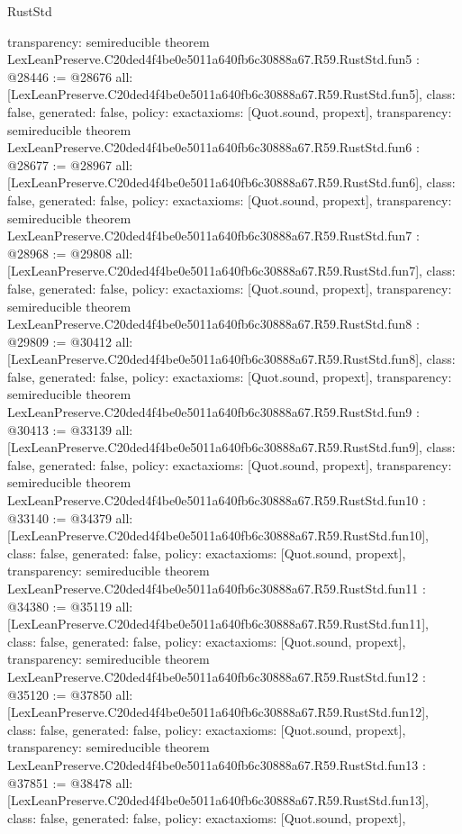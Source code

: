 \begin{lexlean}{RustStd}
\begin{coremodule}
{  transparency: semireducible
}
theorem LexLeanPreserve.C20ded4f4be0e5011a640fb6c30888a67.R59.RustStd.fun5 : @28446 := @28676 {
  all: [LexLeanPreserve.C20ded4f4be0e5011a640fb6c30888a67.R59.RustStd.fun5],
  class: false,
  generated: false,
  policy: exact{axioms: [Quot.sound, propext]},
  transparency: semireducible
}
theorem LexLeanPreserve.C20ded4f4be0e5011a640fb6c30888a67.R59.RustStd.fun6 : @28677 := @28967 {
  all: [LexLeanPreserve.C20ded4f4be0e5011a640fb6c30888a67.R59.RustStd.fun6],
  class: false,
  generated: false,
  policy: exact{axioms: [Quot.sound, propext]},
  transparency: semireducible
}
theorem LexLeanPreserve.C20ded4f4be0e5011a640fb6c30888a67.R59.RustStd.fun7 : @28968 := @29808 {
  all: [LexLeanPreserve.C20ded4f4be0e5011a640fb6c30888a67.R59.RustStd.fun7],
  class: false,
  generated: false,
  policy: exact{axioms: [Quot.sound, propext]},
  transparency: semireducible
}
theorem LexLeanPreserve.C20ded4f4be0e5011a640fb6c30888a67.R59.RustStd.fun8 : @29809 := @30412 {
  all: [LexLeanPreserve.C20ded4f4be0e5011a640fb6c30888a67.R59.RustStd.fun8],
  class: false,
  generated: false,
  policy: exact{axioms: [Quot.sound, propext]},
  transparency: semireducible
}
theorem LexLeanPreserve.C20ded4f4be0e5011a640fb6c30888a67.R59.RustStd.fun9 : @30413 := @33139 {
  all: [LexLeanPreserve.C20ded4f4be0e5011a640fb6c30888a67.R59.RustStd.fun9],
  class: false,
  generated: false,
  policy: exact{axioms: [Quot.sound, propext]},
  transparency: semireducible
}
theorem LexLeanPreserve.C20ded4f4be0e5011a640fb6c30888a67.R59.RustStd.fun10 : @33140 := @34379 {
  all: [LexLeanPreserve.C20ded4f4be0e5011a640fb6c30888a67.R59.RustStd.fun10],
  class: false,
  generated: false,
  policy: exact{axioms: [Quot.sound, propext]},
  transparency: semireducible
}
theorem LexLeanPreserve.C20ded4f4be0e5011a640fb6c30888a67.R59.RustStd.fun11 : @34380 := @35119 {
  all: [LexLeanPreserve.C20ded4f4be0e5011a640fb6c30888a67.R59.RustStd.fun11],
  class: false,
  generated: false,
  policy: exact{axioms: [Quot.sound, propext]},
  transparency: semireducible
}
theorem LexLeanPreserve.C20ded4f4be0e5011a640fb6c30888a67.R59.RustStd.fun12 : @35120 := @37850 {
  all: [LexLeanPreserve.C20ded4f4be0e5011a640fb6c30888a67.R59.RustStd.fun12],
  class: false,
  generated: false,
  policy: exact{axioms: [Quot.sound, propext]},
  transparency: semireducible
}
theorem LexLeanPreserve.C20ded4f4be0e5011a640fb6c30888a67.R59.RustStd.fun13 : @37851 := @38478 {
  all: [LexLeanPreserve.C20ded4f4be0e5011a640fb6c30888a67.R59.RustStd.fun13],
  class: false,
  generated: false,
  policy: exact{axioms: [Quot.sound, propext]},
}
\end{coremodule}
\end{lexlean}
